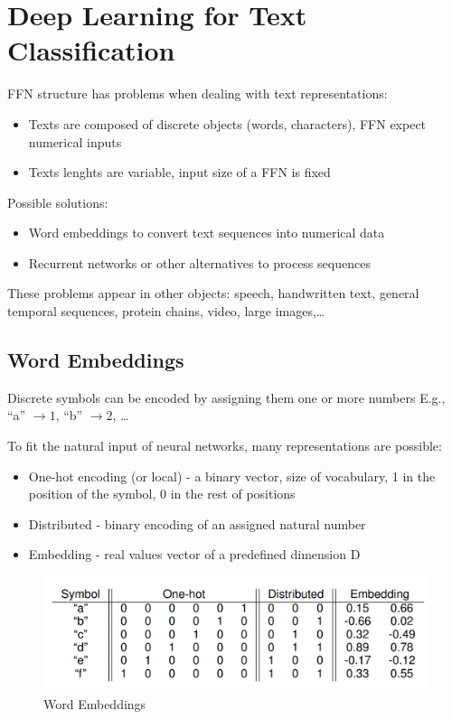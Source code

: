 \chapter{Deep Learning for Text Classification}

FFN structure has problems when dealing with text representations:
\begin{itemize}
	\item Texts are composed of discrete objects (words, characters), FFN expect
numerical inputs
	\item Texts lenghts are variable, input size of a FFN is fixed
\end{itemize}
Possible solutions:
\begin{itemize}
	\item Word embeddings to convert text sequences into numerical data
	\item Recurrent networks or other alternatives to process sequences
\end{itemize}
These problems appear in other objects: speech, handwritten text, general
temporal sequences, protein chains, video, large images,\dots

\section{Word Embeddings}

\begin{paracol}{2}
   
   Discrete symbols can be encoded by assigning them one or more numbers
   E.g., ``a'' $\rightarrow 1$, ``b'' $\rightarrow 2$, \dots
   
   To fit the natural input of neural networks, many representations are possible:
   \begin{itemize}
      \item One-hot encoding (or local) - a binary vector, size of vocabulary, 1 in the position of the symbol, 0 in the rest of positions
      \item Distributed - binary encoding of an assigned natural number
      \item Embedding - real values vector of a predefined dimension D
   \end{itemize}
      
   \switchcolumn

   \begin{figure}[htbp]
      \centering
      \includegraphics{images/09/embeddings.png}
      \caption{Word Embeddings}
      \label{fig:09/embeddings}
   \end{figure}

\end{paracol}
